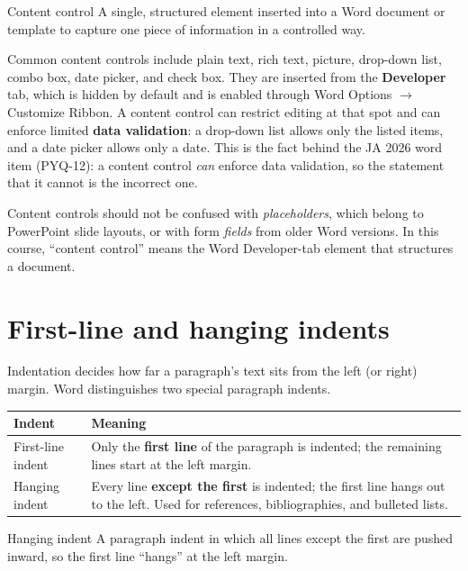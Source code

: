 \begin{definitionbox}{Content control}
A single, structured element inserted into a Word document or template to
capture one piece of information in a controlled way.
\end{definitionbox}

Common content controls include plain text, rich text, picture, drop-down
list, combo box, date picker, and check box. They are inserted from the
\textbf{Developer} tab, which is hidden by default and is enabled through
Word Options $\rightarrow$ Customize Ribbon. A content control can restrict
editing at that spot and can enforce limited \textbf{data validation}: a
drop-down list allows only the listed items, and a date picker allows only a
date. This is the fact behind the JA 2026 word item (PYQ-12): a content
control \emph{can} enforce data validation, so the statement that it cannot is
the incorrect one.

Content controls should not be confused with \emph{placeholders}, which belong
to PowerPoint slide layouts, or with form \emph{fields} from older Word
versions. In this course, ``content control'' means the Word Developer-tab
element that structures a document.

\section{First-line and hanging indents}
Indentation decides how far a paragraph's text sits from the left (or right)
margin. Word distinguishes two special paragraph indents.

\begin{center}
\begin{tabular}{p{}p{}}
\toprule
\textbf{Indent} & \textbf{Meaning} \\
\midrule
First-line indent & Only the \textbf{first line} of the paragraph is indented;
the remaining lines start at the left margin. \\
Hanging indent & Every line \textbf{except the first} is indented; the first
line hangs out to the left. Used for references, bibliographies, and bulleted
lists. \\
\bottomrule
\end{tabular}
\end{center}

\begin{definitionbox}{Hanging indent}
A paragraph indent in which all lines except the first are pushed inward, so
the first line ``hangs'' at the left margin.
\end{definitionbox}


